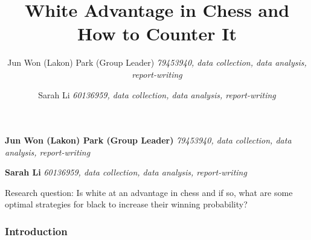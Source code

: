 \documentclass[11pt,]{article}
\title{White Advantage in Chess and How to Counter It  }
\author{\Large Jun Won (Lakon) Park (Group
Leader)\vspace{0.05in} \newline\normalsize\emph{79453940, data
collection, data analysis, report-writing}   \and \Large Sarah
Li\vspace{0.05in} \newline\normalsize\emph{60136959, data collection,
data analysis, report-writing}  }
\date{}
\newcommand*{\authorfont}{\fontfamily{phv}\selectfont}
\renewenvironment{abstract}
 {{%
    \setlength{\leftmargin}{0mm}
    \setlength{\rightmargin}{\leftmargin}%
  }%
  \relax}
 {\endlist}
\begin{document}
	
%    


{%
\setlength{\parindent}{0pt}
\thispagestyle{plain}
{\fontsize{18}{20}\selectfont\raggedright 
\maketitle  %

}

{
   \vskip 13.5pt\relax \normalsize\fontsize{11}{12} 
\textbf{\authorfont Jun Won (Lakon) Park (Group
Leader)} \hskip 15pt \emph{\small 79453940, data collection, data
analysis, report-writing}   \par \textbf{\authorfont Sarah
Li} \hskip 15pt \emph{\small 60136959, data collection, data analysis,
report-writing}   

}

}








\begin{abstract}

    \hbox{\vrule height .2pt width 39.14pc}

    \vskip 8.5pt %

\noindent Research question: Is white at an advantage in chess and if
so, what are some optimal strategies for black to increase their winning
probability?


    \hbox{\vrule height .2pt width 39.14pc}


\end{abstract}


\vskip -8.5pt



\noindent  

\hypertarget{introduction}{%
\subsubsection{\texorpdfstring{\textbf{Introduction}}{Introduction}}\label{introduction}}
\end{document}
